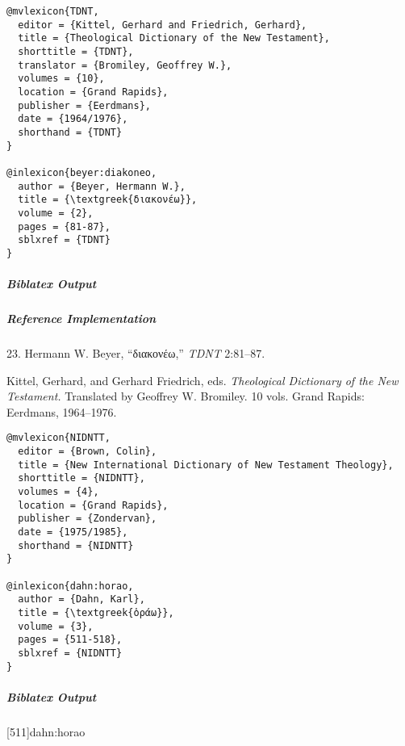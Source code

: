 \documentclass[a4paper]{article}
\newcommand{\textgreek}[1]{{\greekfont #1}}
\newenvironment{biboutput}{%
  \subparagraph{Biblatex Output}
}{\color{black}}
\newenvironment{refimp}{%
  \subparagraph{Reference Implementation}
  \color{reference-colour}
  \rm
}{\par\color{black}}
\begin{document}
\medskip

\begin{lstlisting}
@mvlexicon{TDNT,
  editor = {Kittel, Gerhard and Friedrich, Gerhard},
  title = {Theological Dictionary of the New Testament},
  shorttitle = {TDNT},
  translator = {Bromiley, Geoffrey W.},
  volumes = {10},
  location = {Grand Rapids},
  publisher = {Eerdmans},
  date = {1964/1976},
  shorthand = {TDNT}
}

@inlexicon{beyer:diakoneo,
  author = {Beyer, Hermann W.},
  title = {\textgreek{διακονέω}},
  volume = {2},
  pages = {81-87},
  sblxref = {TDNT}
}
\end{lstlisting}

\begin{biboutput}
\end{biboutput}

\begin{refimp}
  \hspace*{\bibindent}23. Hermann W. Beyer, “\textgreek{διακονέω},” \emph{TDNT}
  2:81–87.

  \hangindent\bibindent Kittel, Gerhard, and Gerhard Friedrich, eds.
  \emph{Theological Dictionary of the New Testament.} Translated by Geoffrey
  W. Bromiley. 10 vols. Grand Rapids: Eerdmans, 1964–1976.

\end{refimp}

\medskip

\begin{lstlisting}
@mvlexicon{NIDNTT,
  editor = {Brown, Colin},
  title = {New International Dictionary of New Testament Theology},
  shorttitle = {NIDNTT},
  volumes = {4},
  location = {Grand Rapids},
  publisher = {Zondervan},
  date = {1975/1985},
  shorthand = {NIDNTT}
}

@inlexicon{dahn:horao,
  author = {Dahn, Karl},
  title = {\textgreek{ὁράω}},
  volume = {3},
  pages = {511-518},
  sblxref = {NIDNTT}
}
\end{lstlisting}

\begin{biboutput}
  [511]{dahn:horao}
\end{biboutput}
\end{document}
